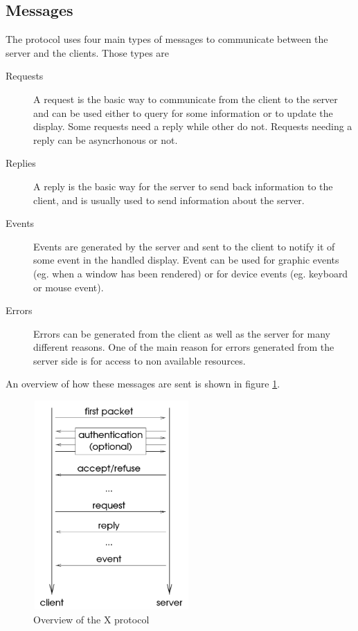 \subsection{Messages}
The protocol uses four main types of messages to communicate between 
the server and the clients. Those types are
\begin{description}
\item[Requests] A request is the basic way to communicate from the client 
  to the server and can be used either to query for some information or to 
  update the display. Some requests need a reply while other do not. 
  Requests needing a reply can be asyncrhonous or not.
\item[Replies] A reply is the basic way for the server to send back
  information to the client, and is usually used to send information about the server.
\item[Events] Events are generated by the server and sent to the client to notify it of 
  some event in the handled display. Event can be used for graphic events 
  (eg. when a window has been rendered) or for device events (eg. keyboard or mouse event).
\item[Errors] Errors can be generated from the client as well as the server
  for many different reasons. One of the main reason for errors generated 
  from the server side is for access to non available resources.
\end{description}
An overview of how these messages are sent is shown in figure \ref{fig:xcore-overview}.
\begin{figure}[tb]
  \begin{center}
    \includegraphics[height=8cm,width=6cm]{../imgs/xcore-overview.png}
    \caption{\label{fig:xcore-overview}Overview of the X protocol \protect\footnotemark}
  \end{center}
\end{figure}
